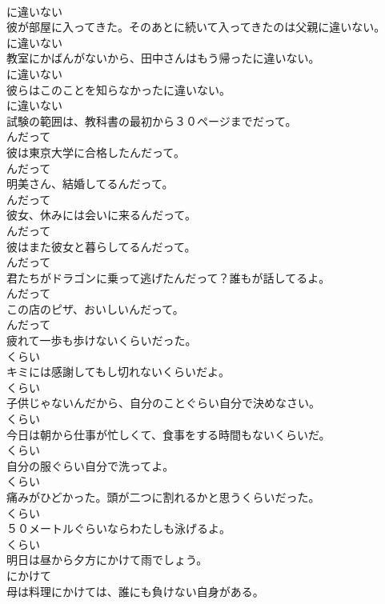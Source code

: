 \documentclass[8pt]{extreport}
\begin{document}
\begin{CJK}{UTF8}{min}
\\	に違いない
\\	彼が部屋に入ってきた。そのあとに続いて入ってきたのは父親に違いない。	
\\	に違いない
\\	教室にかばんがないから、田中さんはもう帰ったに違いない。	
\\	に違いない
\\	彼らはこのことを知らなかったに違いない。	
\\	に違いない
\\	試験の範囲は、教科書の最初から３０ページまでだって。	
\\	んだって
\\	彼は東京大学に合格したんだって。	
\\	んだって
\\	明美さん、結婚してるんだって。	
\\	んだって
\\	彼女、休みには会いに来るんだって。	
\\	んだって
\\	彼はまた彼女と暮らしてるんだって。	
\\	んだって
\\	君たちがドラゴンに乗って逃げたんだって？誰もが話してるよ。	
\\	んだって
\\	この店のピザ、おいしいんだって。	
\\	んだって
\\	疲れて一歩も歩けないくらいだった。	
\\	くらい
\\	キミには感謝してもし切れないくらいだよ。	
\\	くらい
\\	子供じゃないんだから、自分のことぐらい自分で決めなさい。	
\\	くらい
\\	今日は朝から仕事が忙しくて、食事をする時間もないくらいだ。	
\\	くらい
\\	自分の服ぐらい自分で洗ってよ。	
\\	くらい
\\	痛みがひどかった。頭が二つに割れるかと思うくらいだった。	
\\	くらい
\\	５０メートルぐらいならわたしも泳げるよ。	
\\	くらい
\\	明日は昼から夕方にかけて雨でしょう。	
\\	にかけて
\\	母は料理にかけては、誰にも負けない自身がある。	

\end{CJK}
\end{document}
